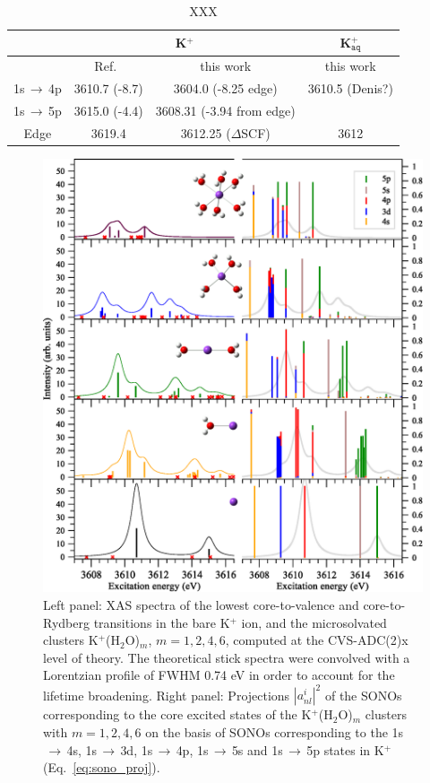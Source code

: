 \documentclass[journal=jacsat,manuscript=suppinfo]{achemso}
\begin{document}
\begin{table}
\begin{tabular}{c c c c}
\hline\hline
& \multicolumn{2}{c}{K$^{+}$} & K$^{+}_{\texttt{aq}}$ \\
\hline
& Ref.\ \citep{hertlein06:062715} & this work & this work \\
1s$\,\rightarrow\,$4p & 3610.7 (-8.7)& 3604.0 (-8.25 edge) & 3610.5 (Denis?)\\
1s$\,\rightarrow\,$5p & 3615.0 (-4.4) & 3608.31 (-3.94 from edge) & \\
Edge & 3619.4 & 3612.25 ($\Delta$SCF) & 3612 \\
\hline
\end{tabular}
\caption{XXX}
\end{table}



\begin{figure}
\centering
\includegraphics[scale=0.6]{figures/fg1_kh2on_xas_overlaps.eps}
\caption{Left panel: XAS spectra of the lowest core-to-valence and core-to-Rydberg transitions in the bare K$^{+}$ ion, and the microsolvated clusters K$^{+}$(H$_2$O)$_m$, $m = 1, 2, 4, 6$, computed at the CVS-ADC(2)x level of theory. The theoretical stick spectra were convolved with a Lorentzian profile of FWHM 0.74 eV in order to account for the lifetime broadening. Right panel: Projections $|a_{nl}^{i}|^2$ of the SONOs corresponding to the core excited states of the K$^{+}$(H$_2$O)$_m$ clusters with $m = 1, 2, 4, 6$ on the basis of SONOs corresponding to the 1s$\,\rightarrow\,$4s, 1s$\,\rightarrow\,$3d, 1s$\,\rightarrow\,$4p, 1s$\,\rightarrow\,$5s and 1s$\,\rightarrow\,$5p states in K$^+$ (Eq.\ \ref{eq:sono_proj}).
}
\end{figure}
\end{document}
